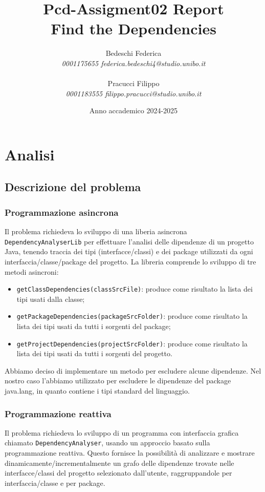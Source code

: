 \documentclass[a4paper,12pt]{report}
\title{\textbf{Pcd-Assigment02 Report}\\\large Find the Dependencies}
\author{
Bedeschi Federica \\
\textit{0001175655 federica.bedeschi4@studio.unibo.it}\\\\
Pracucci Filippo \\
\textit{0001183555 filippo.pracucci@studio.unibo.it}
}
\date{Anno accademico 2024-2025}
\begin{document}
\maketitle
\newpage

\tableofcontents

\chapter{Analisi}
\section{Descrizione del problema}
\subsection{Programmazione asincrona}
Il problema richiedeva lo sviluppo di una liberia asincrona \texttt{DependencyAnalyserLib} per effettuare l'analisi delle dipendenze di un progetto Java, tenendo traccia dei tipi (interfacce/classi) e dei package utilizzati da ogni interfaccia/classe/package del progetto. La libreria comprende lo sviluppo di tre metodi asincroni:
\begin{itemize}
    \item \texttt{getClassDependencies(classSrcFile)}: produce come risultato la lista dei tipi usati dalla classe;
    \item \texttt{getPackageDependencies(packageSrcFolder)}: produce come risultato la lista dei tipi usati da tutti i sorgenti del package;
    \item \texttt{getProjectDependencies(projectSrcFolder)}: produce come risultato la lista dei tipi usati da tutti i sorgenti del progetto.
\end{itemize}
Abbiamo deciso di implementare un metodo per escludere alcune dipendenze. Nel nostro caso l'abbiamo utilizzato per escludere le dipendenze del package java.lang, in quanto contiene i tipi standard del linguaggio.
\subsection{Programmazione reattiva}
Il problema richiedeva lo sviluppo di un programma con interfaccia grafica chiamato \texttt{DependencyAnalyser}, usando un approccio basato sulla programmazione reattiva. Questo fornisce la possibilità di analizzare e mostrare dinamicamente/incrementalmente un grafo delle dipendenze trovate nelle interfacce/classi del progetto selezionato dall'utente, raggruppandole per interfaccia/classe e per package.
\end{document}
